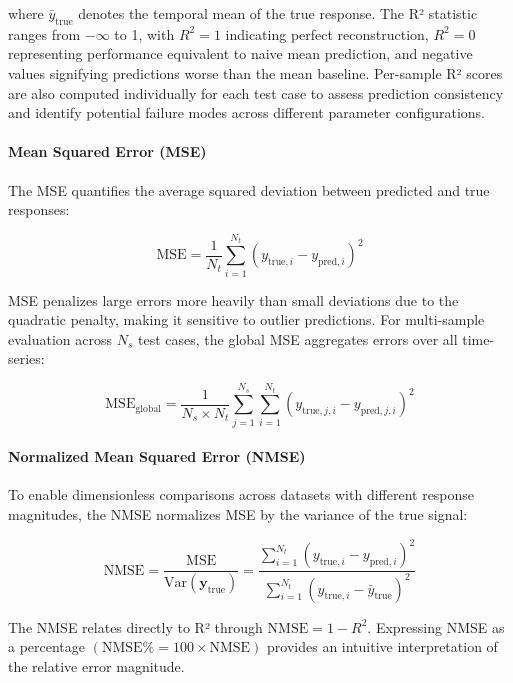 \documentclass[12pt,a4paper]{report}
\begin{document}
where $\bar{y}_{\text{true}}$ denotes the temporal mean of the true response. The R² statistic ranges from $-\infty$ to 1, with $R^2 = 1$ indicating perfect reconstruction, $R^2 = 0$ representing performance equivalent to naive mean prediction, and negative values signifying predictions worse than the mean baseline. Per-sample R² scores are also computed individually for each test case to assess prediction consistency and identify potential failure modes across different parameter configurations.

\paragraph{Mean Squared Error (MSE)} The MSE quantifies the average squared deviation between predicted and true responses:

\begin{equation}
\text{MSE} = \frac{1}{N_t} \sum_{i=1}^{N_t} (y_{\text{true},i} - y_{\text{pred},i})^2
\end{equation}

MSE penalizes large errors more heavily than small deviations due to the quadratic penalty, making it sensitive to outlier predictions. For multi-sample evaluation across $N_s$ test cases, the global MSE aggregates errors over all time-series:

\begin{equation}
\text{MSE}_{\text{global}} = \frac{1}{N_s \times N_t} \sum_{j=1}^{N_s} \sum_{i=1}^{N_t} (y_{\text{true},j,i} - y_{\text{pred},j,i})^2
\end{equation}



\paragraph{Normalized Mean Squared Error (NMSE)} To enable dimensionless comparisons across datasets with different response magnitudes, the NMSE normalizes MSE by the variance of the true signal:

\begin{equation}
\text{NMSE} = \frac{\text{MSE}}{\text{Var}(\mathbf{y}_{\text{true}})} = \frac{\sum_{i=1}^{N_t} (y_{\text{true},i} - y_{\text{pred},i})^2}{\sum_{i=1}^{N_t} (y_{\text{true},i} - \bar{y}_{\text{true}})^2}
\end{equation}

The NMSE relates directly to R² through $\text{NMSE} = 1 - R^2$. Expressing NMSE as a percentage $(\text{NMSE}\% = 100 \times \text{NMSE})$ provides an intuitive interpretation of the relative error magnitude.
\end{document}
